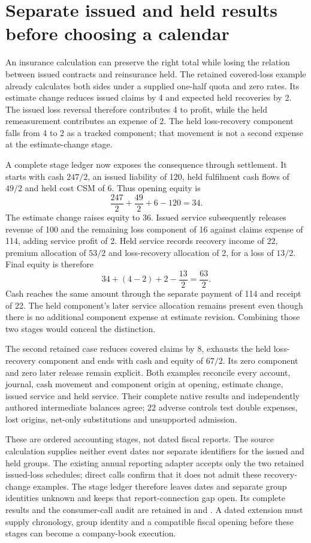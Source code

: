 \section{Separate issued and held results before choosing a calendar}
\label{sim:insurance-recovery-stages}

An insurance calculation can preserve the right total while losing the relation
between issued contracts and reinsurance held. The retained covered-loss example
already calculates both sides under a supplied one-half quota and zero rates.
Its estimate change reduces issued claims by 4 and expected held recoveries by
2. The issued loss reversal therefore contributes 4 to profit, while the held
remeasurement contributes an expense of 2. The held loss-recovery component
falls from 4 to 2 as a tracked component; that movement is not a second expense
at the estimate-change stage.

A complete stage ledger now exposes the consequence through settlement. It
starts with cash $247/2$, an issued liability of 120, held fulfilment cash flows
of $49/2$ and held cost CSM of 6. Thus opening equity is
\[
 \frac{247}{2}+\frac{49}{2}+6-120=34.
\]
The estimate change raises equity to 36. Issued service subsequently releases
revenue of 100 and the remaining loss component of 16 against claims expense
of 114, adding service profit of 2. Held service records recovery income of 22,
premium allocation of $53/2$ and loss-recovery allocation of 2, for a loss of
$13/2$. Final equity is therefore
\[
 34+(4-2)+2-\frac{13}{2}=\frac{63}{2}.
\]
Cash reaches the same amount through the separate payment of 114 and receipt
of 22. The held component's later service allocation remains present even
though there is no additional component expense at estimate revision. Combining
those two stages would conceal the distinction.

The second retained case reduces covered claims by 8, exhausts the held
loss-recovery component and ends with cash and equity of $67/2$. Its zero
component and zero later release remain explicit. Both examples reconcile
every account, journal, cash movement and component origin at opening, estimate
change, issued service and held service. Their complete native results and
independently authored intermediate balances agree; 22 adverse controls test
double expenses, lost origins, net-only substitutions and unsupported admission.

These are ordered accounting stages, not dated fiscal reports. The source
calculation supplies neither event dates nor separate identifiers for the issued
and held groups. The existing annual reporting adapter accepts only the two
retained issued-loss schedules; direct calls confirm that it does not admit
these recovery-change examples. The stage ledger therefore leaves dates and
separate group identities unknown and keeps that report-connection gap open.
Its complete results and the consumer-call audit are retained in
and .
A dated extension must supply chronology, group identity and a compatible fiscal
opening before these stages can become a company-book execution.
